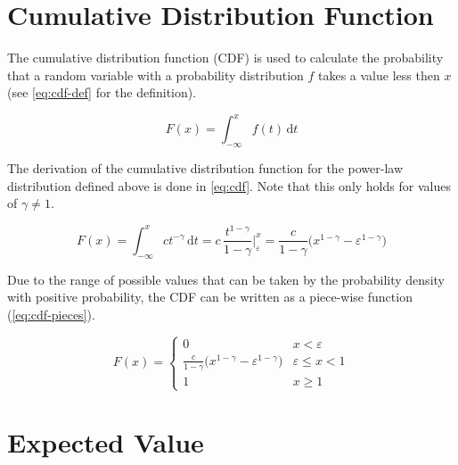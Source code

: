 

\section{Cumulative Distribution Function}
\label{sec:cdf}

The cumulative distribution function (CDF) is used to calculate the probability that a random variable with a probability distribution \(f\) takes a value less then \(x\) (see \cref{eq:cdf-def} for the definition).

\begin{equation}
	F(x) = \int_{-\infty}^{x} f(t) \, \mathrm{d}t
	\label{eq:cdf-def}
\end{equation}

The derivation of the cumulative distribution function for the power-law distribution defined above is done in \cref{eq:cdf}.
Note that this only holds for values of \(\gamma \neq 1\).

\begin{equation}
	F(x) = \int_{-\infty}^{x} ct^{-\gamma} \, \mathrm{d}t = c \, \frac{t^{1-\gamma}}{1-\gamma}  \bigg |_{\varepsilon}^{x} = \frac{c}{1-\gamma} \Big( x^{1 - \gamma} - \varepsilon^{1 - \gamma} \Big)
	\label{eq:cdf}
\end{equation}

Due to the range of possible values that can be taken by the probability density with positive probability, the CDF can be written as a piece-wise function (\cref{eq:cdf-pieces}).

\begin{equation}
	F(x) =
	\begin{cases}
		0                                                                        & x < \varepsilon        \\
		\frac{c}{1-\gamma} \Big( x^{1 - \gamma} - \varepsilon^{1 - \gamma} \Big) & \varepsilon \leq x < 1 \\
		1                                                                        & x \geq 1
	\end{cases}
	\label{eq:cdf-pieces}
\end{equation}




\section{Expected Value}
\label{sec:expected-value}

